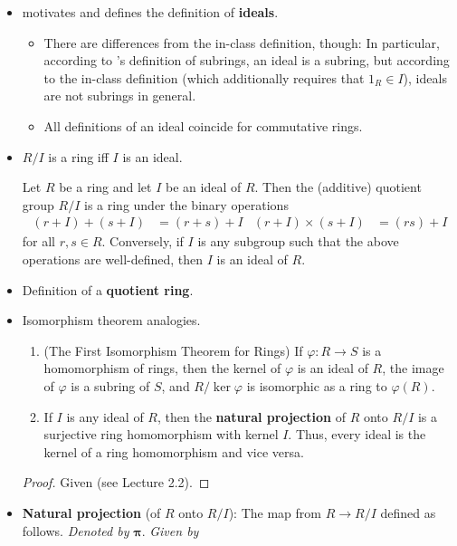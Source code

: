 \documentclass[../notes.tex]{subfiles}
\begin{document}
\begin{itemize}
    \item \textcite{bib:DummitFoote} motivates and defines the definition of \textbf{ideals}.
    \begin{itemize}
        \item There are differences from the in-class definition, though: In particular, according to \textcite{bib:DummitFoote}'s definition of subrings, an ideal is a subring, but according to the in-class definition (which additionally requires that $1_R\in I$), ideals are not subrings in general.
        \item All definitions of an ideal coincide for commutative rings.
    \end{itemize}
    \item $R/I$ is a ring iff $I$ is an ideal.
    \begin{proposition}\label{prp:7.6}
        Let $R$ be a ring and let $I$ be an ideal of $R$. Then the (additive) quotient group $R/I$ is a ring under the binary operations
        \begin{align*}
            (r+I)+(s+I) &= (r+s)+I&
            (r+I)\times(s+I) &= (rs)+I
        \end{align*}
        for all $r,s\in R$. Conversely, if $I$ is any subgroup such that the above operations are well-defined, then $I$ is an ideal of $R$.
    \end{proposition}
    \item Definition of a \textbf{quotient ring}.
    \item Isomorphism theorem analogies.
    \begin{theorem}\label{trm:7.7}\leavevmode
        \begin{enumerate}
            \item (The First Isomorphism Theorem for Rings) If $\varphi:R\to S$ is a homomorphism of rings, then the kernel of $\varphi$ is an ideal of $R$, the image of $\varphi$ is a subring of $S$, and $R/\ker\varphi$ is isomorphic as a ring to $\varphi(R)$.
            \item If $I$ is any ideal of $R$, then the \textbf{natural projection} of $R$ onto $R/I$ is a surjective ring homomorphism with kernel $I$. Thus, every ideal is the kernel of a ring homomorphism and vice versa.
        \end{enumerate}
        \begin{proof}
            Given (see Lecture 2.2).
        \end{proof}
    \end{theorem}
    \item \textbf{Natural projection} (of $R$ onto $R/I$): The map from $R\to R/I$ defined as follows. \emph{Denoted by} $\bm{\pi}$. \emph{Given by}

\end{itemize}
\end{document}
